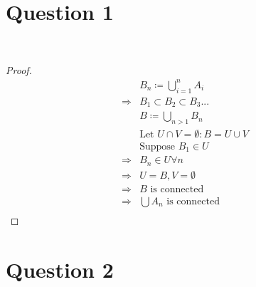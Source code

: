 \documentclass{article}
\begin{document}
\section*{Question 1}

~

\begin{proof}
    \begin{align*}
        &B_n\coloneqq \bigcup_{i=1}^{n}A_i\\
        \Rightarrow&B_1\subset B_2\subset B_3...\\
        &B\coloneqq \bigcup_{n>1}B_n\\
        &\text{Let } U\cap V=\emptyset:B=U\cup V\\
        &\text{Suppose }B_1\in U\\
        \Rightarrow&B_n\in U\forall n\\
        \Rightarrow&U=B,V=\emptyset\\
        \Rightarrow&B\text{ is connected}\\
        \Rightarrow&\bigcup A_n\text{ is connected}\\
    \end{align*}
\end{proof}

\newpage

\section*{Question 2}

~
\end{document}
